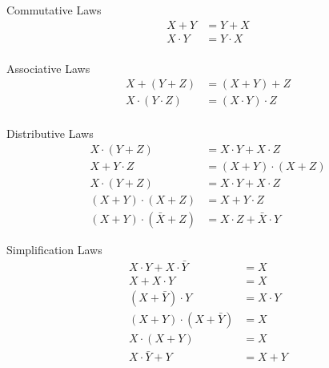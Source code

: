 \documentclass{report}
\begin{document}
\begin{minipage}[t]{0.4\linewidth}
	\begin{itemize}
		\ii Commutative Laws
		\begin{align*}
			X + Y     & = Y + X     \\
			X \cdot Y & = Y \cdot X \\
		\end{align*}

		\ii Associative Laws
		\begin{align*}
			X + (Y + Z)         & = (X + Y) + Z         \\
			X \cdot (Y \cdot Z) & = (X \cdot Y) \cdot Z \\
		\end{align*}

		\ii Distributive Laws
		\begin{align*}
			X \cdot (Y + Z)       & = X \cdot Y + X \cdot Z     \\
			X + Y \cdot Z         & = (X + Y) \cdot (X + Z)     \\
			X \cdot (Y+Z)         & = X\cdot Y + X \cdot Z      \\
			(X+Y)\cdot(X+Z)       & = X + Y \cdot Z             \\
			(X+Y)\cdot(\bar{X}+Z) & = X\cdot Z + \bar{X}\cdot Y
		\end{align*}

		\ii Simplification Laws
		\begin{align*}
			X \cdot Y + X \cdot \bar{Y} & = X         \\
			X + X\cdot Y                & = X         \\
			(X + \bar{Y}) \cdot Y       & = X \cdot Y \\
			(X + Y)\cdot(X + \bar{Y})   & = X         \\
			X \cdot (X + Y)             & = X         \\
			X \cdot \bar{Y} + Y         & = X + Y
		\end{align*}
	\end{itemize}
\end{minipage}
\end{document}
